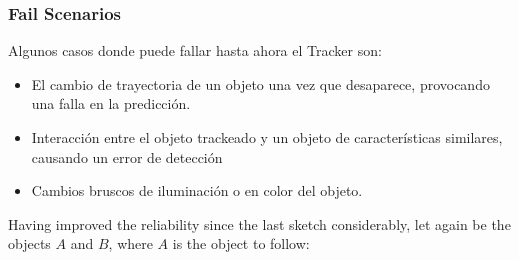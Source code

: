 \subsubsection{Fail Scenarios}

Algunos casos donde puede fallar hasta ahora el Tracker son:
\begin{itemize}
\item El cambio de trayectoria de un objeto una vez que desaparece, provocando una falla en la predicción.
\item Interacción entre el objeto trackeado y un objeto de características similares, causando un error de detección
\item Cambios bruscos de iluminación o en color del objeto.
\end{itemize}







Having improved the reliability since the last sketch considerably, let again be the objects $A$ and $B$, where $A$ is the object to follow: 

